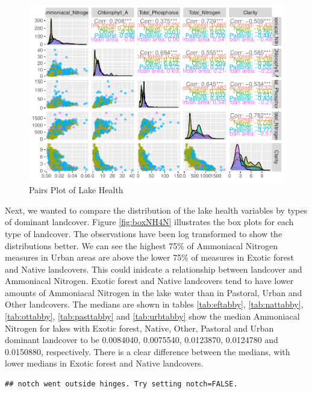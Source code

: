 \documentclass[
]{article}
\begin{document}
\begin{figure}
\centering
\includegraphics{Final-Report_files/figure-latex/pairsplot-1.pdf}
\caption{\label{fig:pairsplot}Pairs Plot of Lake Health}
\end{figure}

Next, we wanted to compare the distribution of the lake health variables by types of dominant landcover. Figure \ref{fig:boxNH4N} illustrates the box plots for each type of landcover. The observations have been log transformed to show the distributions better. We can see the highest 75\% of Ammoniacal Nitrogen measures in Urban areas are above the lower 75\% of measures in Exotic forest and Native landcovers. This could inidcate a relationship between landcover and Ammoniacal Nitrogen. Exotic forest and Native landcovers tend to have lower amounts of Ammoniacal Nitrogen in the lake water than in Pastoral, Urban and Other landcovers. The medians are shown in tables \ref{tab:eftabby}, \ref{tab:nattabby}, \ref{tab:ottabby}, \ref{tab:pasttabby} and \ref{tab:urbtabby} show the median Ammoniacal Nitrogen for lakes with Exotic forest, Native, Other, Pastoral and Urban dominant landcover to be 0.0084040, 0.0075540, 0.0123870, 0.0124780 and 0.0150880, respectively. There is a clear difference between the medians, with lower medians in Exotic forest and Native landcovers.

\begin{verbatim}
## notch went outside hinges. Try setting notch=FALSE.
\end{verbatim}
\end{document}
